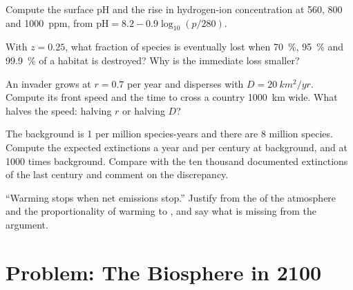 \begin{exercise}[$\star\star$]\label{exo:b2:global-change:8}
Compute the surface pH and the rise in hydrogen-ion concentration
at 560, 800 and \qty{1000}{ppm}, from $\mathrm{pH} = 8.2 -
0.9\log_{10}(p/280)$.
\end{exercise}

\begin{exercise}[$\star\star$]\label{exo:b2:global-change:9}
With $z = 0.25$, what fraction of species is eventually lost when
\qty{70}{\%}, \qty{95}{\%} and \qty{99.9}{\%} of a habitat is
destroyed? Why is the immediate loss smaller?
\end{exercise}

\begin{exercise}[$\star\star\star$]\label{exo:b2:global-change:10}
An invader grows at $r = 0.7$ per year and disperses with $D =
\qty{20}{km^2/yr}$. Compute its front speed and the time to cross a
country \qty{1000}{km} wide. What halves the speed: halving $r$ or
halving $D$?
\end{exercise}

\begin{exercise}[$\star\star\star$]\label{exo:b2:global-change:11}
The background  is 1 per million species-years and
there are 8 million species. Compute the expected extinctions a
year and per century at background, and at 1000 times background.
Compare with the ten thousand documented extinctions of the last
century and comment on the discrepancy.
\end{exercise}

\begin{exercise}[$\star\star\star$]\label{exo:b2:global-change:12}
``Warming stops when net emissions stop.'' Justify from the  of the atmosphere and the proportionality of warming to
, and say what is missing from the argument.
\end{exercise}

\section{Problem: The Biosphere in 2100}

